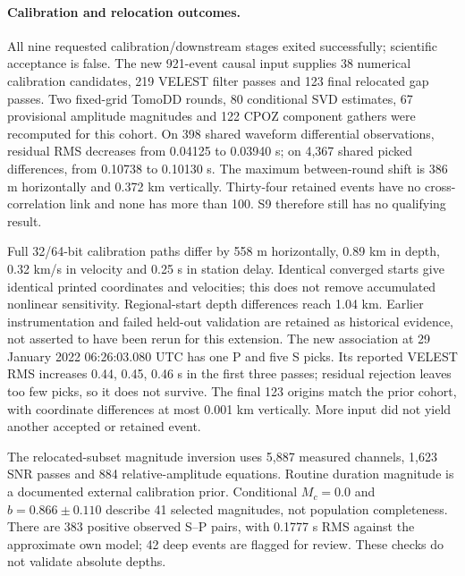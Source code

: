 \paragraph{Calibration and relocation outcomes.}
All nine requested calibration/downstream stages exited successfully; scientific acceptance is false. The new 921-event causal input supplies 38 numerical calibration candidates, 219 VELEST filter passes and 123 final relocated gap passes. Two fixed-grid TomoDD rounds, 80 conditional SVD estimates, 67 provisional amplitude magnitudes and 122 CPOZ component gathers were recomputed for this cohort. On 398 shared waveform differential observations, residual RMS decreases from 0.04125 to 0.03940 s; on 4,367 shared picked differences, from 0.10738 to 0.10130 s. The maximum between-round shift is 386 m horizontally and 0.372 km vertically. Thirty-four retained events have no cross-correlation link and none has more than 100. S9 therefore still has no qualifying result.

Full 32/64-bit calibration paths differ by 558 m horizontally, 0.89 km in depth, 0.32 km/s in velocity and 0.25 s in station delay. Identical converged starts give identical printed coordinates and velocities; this does not remove accumulated nonlinear sensitivity. Regional-start depth differences reach 1.04 km. Earlier instrumentation and failed held-out validation are retained as historical evidence, not asserted to have been rerun for this extension. The new association at 29 January 2022 06:26:03.080 UTC has one P and five S picks. Its reported VELEST RMS increases 0.44, 0.45, 0.46 s in the first three passes; residual rejection leaves too few picks, so it does not survive. The final 123 origins match the prior cohort, with coordinate differences at most 0.001 km vertically. More input did not yield another accepted or retained event.

The relocated-subset magnitude inversion uses 5,887 measured channels, 1,623 SNR passes and 884 relative-amplitude equations. Routine duration magnitude is a documented external calibration prior. Conditional $M_c=0.0$ and $b=0.866\pm0.110$ describe 41 selected magnitudes, not population completeness. There are 383 positive observed S--P pairs, with 0.1777 s RMS against the approximate own model; 42 deep events are flagged for review. These checks do not validate absolute depths.

